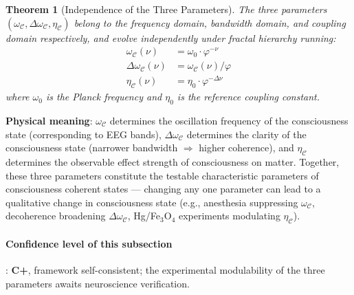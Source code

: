 \documentclass[12pt,a4paper,twocolumn]{article}
\renewcommand{\phi}{\varphi}
\newtheorem{theorem}{Theorem}[section]
\begin{document}
\begin{theorem}[Independence of the Three Parameters]
\label{thm:three_params}
The three parameters $(\omega_{\mathcal{C}}, \Delta\omega_{\mathcal{C}}, \eta_{\mathcal{C}})$ belong to the frequency domain, bandwidth domain, and coupling domain respectively, and evolve independently under fractal hierarchy running:
\begin{align}
\omega_{\mathcal{C}}(\nu) &= \omega_0 \cdot \phi^{-\nu} \\
\Delta\omega_{\mathcal{C}}(\nu) &= \omega_{\mathcal{C}}(\nu) / \phi \\
\eta_{\mathcal{C}}(\nu) &= \eta_0 \cdot \phi^{-\Delta\nu}
\end{align}
where $\omega_0$ is the Planck frequency and $\eta_0$ is the reference coupling constant.
\end{theorem}

\noindent\textbf{Physical meaning}: $\omega_{\mathcal{C}}$ determines the oscillation frequency of the consciousness state (corresponding to EEG bands), $\Delta\omega_{\mathcal{C}}$ determines the clarity of the consciousness state (narrower bandwidth $\Rightarrow$ higher coherence), and $\eta_{\mathcal{C}}$ determines the observable effect strength of consciousness on matter. Together, these three parameters constitute the testable characteristic parameters of consciousness coherent states --- changing any one parameter can lead to a qualitative change in consciousness state (e.g., anesthesia suppressing $\omega_{\mathcal{C}}$, decoherence broadening $\Delta\omega_{\mathcal{C}}$, Hg/Fe$_3$O$_4$ experiments modulating $\eta_{\mathcal{C}}$).

\paragraph{Confidence level of this subsection}: \textbf{C+}, framework self-consistent; the experimental modulability of the three parameters awaits neuroscience verification.
\end{document}
